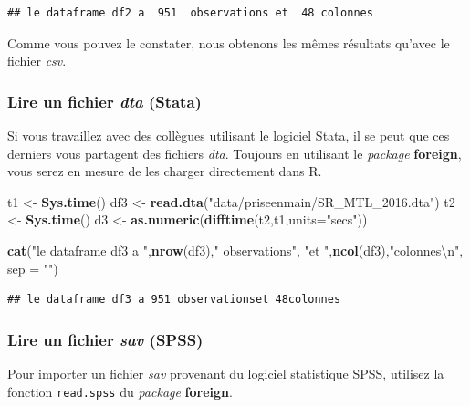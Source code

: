 \documentclass[
  11pt,
  french,
]{book}
\makeatletter
\newenvironment{Shaded}{\begin{snugshade}}{\end{snugshade}}
\newcommand{\CharTok}[1]{\textcolor[rgb]{0.31,0.60,0.02}{#1}}
\newcommand{\DataTypeTok}[1]{\textcolor[rgb]{0.13,0.29,0.53}{#1}}
\newcommand{\KeywordTok}[1]{\textcolor[rgb]{0.13,0.29,0.53}{\textbf{#1}}}
\newcommand{\NormalTok}[1]{#1}
\newcommand{\StringTok}[1]{\textcolor[rgb]{0.31,0.60,0.02}{#1}}
\newenvironment{kframe}{%
\medskip{}
\setlength{\fboxsep}{.8em}
 \def\at@end@of@kframe{}%
 \ifinner\ifhmode%
  \def\at@end@of@kframe{\end{minipage}}%
  \begin{minipage}{\columnwidth}%
 \fi\fi%
 \def\FrameCommand##1{\hskip\@totalleftmargin \hskip-\fboxsep
 \colorbox{shadecolor}{##1}\hskip-\fboxsep
     \hskip-\linewidth \hskip-\@totalleftmargin \hskip\columnwidth}%
 \MakeFramed {\advance\hsize-\width
   \@totalleftmargin\z@ \linewidth\hsize
   \@setminipage}}%
 {\par\unskip\endMakeFramed%
 \at@end@of@kframe}
\renewenvironment{Shaded}{\begin{kframe}}{\end{kframe}}
\makeatother
\begin{document}
\begin{verbatim}
## le dataframe df2 a  951  observations et  48 colonnes
\end{verbatim}

Comme vous pouvez le constater, nous obtenons les mêmes résultats qu'avec le fichier \emph{csv}.

\hypertarget{sect01413}{%
\subsubsection{\texorpdfstring{Lire un fichier \emph{dta} (Stata)}{Lire un fichier dta (Stata)}}\label{sect01413}}

Si vous travaillez avec des collègues utilisant le logiciel Stata, il se peut que ces derniers vous partagent des fichiers \emph{dta}. Toujours en utilisant le \emph{package} \textbf{foreign}, vous serez en mesure de les charger directement dans R.

\begin{Shaded}
\begin{Highlighting}[]
\NormalTok{t1 <-}\StringTok{ }\KeywordTok{Sys.time}\NormalTok{()}
\NormalTok{df3 <-}\StringTok{ }\KeywordTok{read.dta}\NormalTok{(}\StringTok{"data/priseenmain/SR_MTL_2016.dta"}\NormalTok{)}
\NormalTok{t2 <-}\StringTok{ }\KeywordTok{Sys.time}\NormalTok{()}
\NormalTok{d3 <-}\StringTok{ }\KeywordTok{as.numeric}\NormalTok{(}\KeywordTok{difftime}\NormalTok{(t2,t1,}\DataTypeTok{units=}\StringTok{"secs"}\NormalTok{))}

\KeywordTok{cat}\NormalTok{(}\StringTok{"le dataframe df3 a "}\NormalTok{,}\KeywordTok{nrow}\NormalTok{(df3),}\StringTok{" observations"}\NormalTok{,}
    \StringTok{"et "}\NormalTok{,}\KeywordTok{ncol}\NormalTok{(df3),}\StringTok{"colonnes}\CharTok{\textbackslash{}n}\StringTok{"}\NormalTok{, }\DataTypeTok{sep =} \StringTok{""}\NormalTok{)}
\end{Highlighting}
\end{Shaded}

\begin{verbatim}
## le dataframe df3 a 951 observationset 48colonnes
\end{verbatim}

\hypertarget{sect01414}{%
\subsubsection{\texorpdfstring{Lire un fichier \emph{sav} (SPSS)}{Lire un fichier sav (SPSS)}}\label{sect01414}}

Pour importer un fichier \emph{sav} provenant du logiciel statistique SPSS, utilisez la fonction \texttt{read.spss} du \emph{package} \textbf{foreign}.
\end{document}
